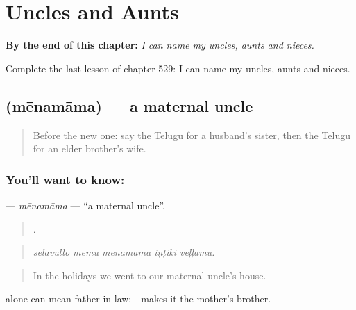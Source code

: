 
\chapter{Uncles and Aunts}
\label{ch:te-uncles-and-aunts}

\begin{chapteropening}
\textbf{By the end of this chapter:} \emph{I can name my uncles, aunts and nieces.}

Complete the last lesson of chapter 529: I can name my uncles, aunts and nieces.
\end{chapteropening}

\section[\texorpdfstring{\te{మేనమామ} (mēnamāma)}{మేనమామ (mēnamāma)}]{ (mēnamāma) — a maternal uncle}

\label{lesson:TE-C529-menamama}



\begin{quote}
Before the new one: say the Telugu for a husband's sister, then the Telugu for an elder brother's wife.
\end{quote}

\subsection*{You'll want to know: }
\textbf{} — \emph{mēnamāma} — \textquotedblleft{}a maternal uncle\textquotedblright{}.

\begin{quote}
    .
\end{quote}

\begin{quote}
\emph{selavullō mēmu mēnamāma iṇṭiki veḷḷāmu.}
\end{quote}

\begin{quote}
In the holidays we went to our maternal uncle's house.
\end{quote}

 alone can mean father-in-law; - makes it the mother's brother.

